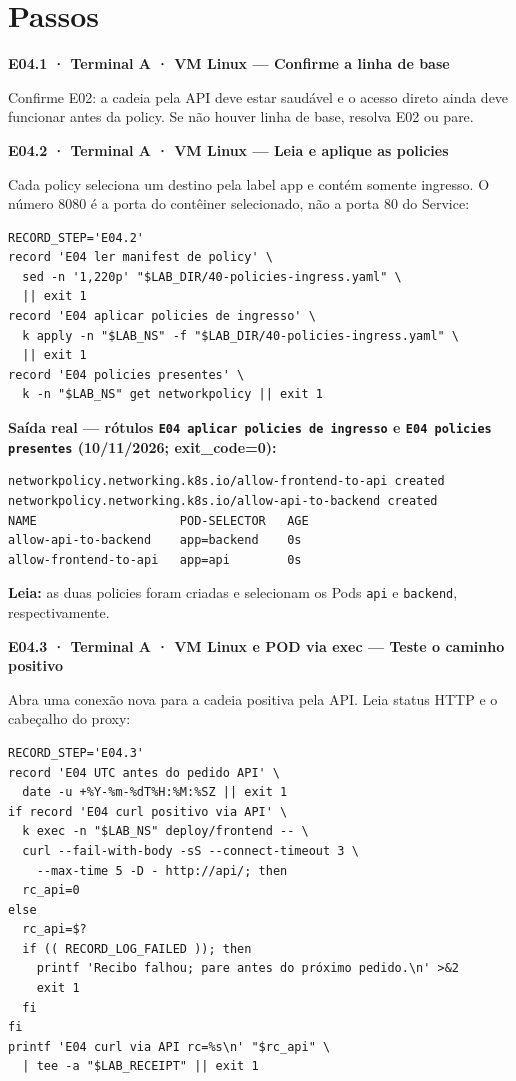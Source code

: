 \documentclass[12pt,openany,oneside,a4paper,chapter=TITLE,english,brazil]{abntex2}
\begin{document}
\section*{Passos}\label{passos-3}

\textbf{E04.1 · Terminal A · VM Linux --- Confirme a linha de base}

Confirme E02: a cadeia pela API deve estar saudável e o acesso direto ainda deve funcionar antes da policy. Se não houver linha de base, resolva E02 ou pare.

\textbf{E04.2 · Terminal A · VM Linux --- Leia e aplique as policies}

Cada policy seleciona um destino pela label app e contém somente ingresso. O número 8080 é a porta do contêiner selecionado, não a porta 80 do Service:

\begin{verbatim}
RECORD_STEP='E04.2'
record 'E04 ler manifest de policy' \
  sed -n '1,220p' "$LAB_DIR/40-policies-ingress.yaml" \
  || exit 1
record 'E04 aplicar policies de ingresso' \
  k apply -n "$LAB_NS" -f "$LAB_DIR/40-policies-ingress.yaml" \
  || exit 1
record 'E04 policies presentes' \
  k -n "$LAB_NS" get networkpolicy || exit 1
\end{verbatim}

\clearpage

\textbf{Saída real --- rótulos \texttt{E04 aplicar policies de ingresso} e \texttt{E04 policies presentes} (10/11/2026; exit\_code=0):}

\begin{verbatim}
networkpolicy.networking.k8s.io/allow-frontend-to-api created
networkpolicy.networking.k8s.io/allow-api-to-backend created
NAME                    POD-SELECTOR   AGE
allow-api-to-backend    app=backend    0s
allow-frontend-to-api   app=api        0s
\end{verbatim}

\textbf{Leia:} as duas policies foram criadas e selecionam os Pods \texttt{api} e \texttt{backend}, respectivamente.

\textbf{E04.3 · Terminal A · VM Linux e POD via exec --- Teste o caminho positivo}

Abra uma conexão nova para a cadeia positiva pela API. Leia status HTTP e o cabeçalho do proxy:

\begin{verbatim}
RECORD_STEP='E04.3'
record 'E04 UTC antes do pedido API' \
  date -u +%Y-%m-%dT%H:%M:%SZ || exit 1
if record 'E04 curl positivo via API' \
  k exec -n "$LAB_NS" deploy/frontend -- \
  curl --fail-with-body -sS --connect-timeout 3 \
    --max-time 5 -D - http://api/; then
  rc_api=0
else
  rc_api=$?
  if (( RECORD_LOG_FAILED )); then
    printf 'Recibo falhou; pare antes do próximo pedido.\n' >&2
    exit 1
  fi
fi
printf 'E04 curl via API rc=%s\n' "$rc_api" \
  | tee -a "$LAB_RECEIPT" || exit 1
\end{verbatim}
\end{document}
